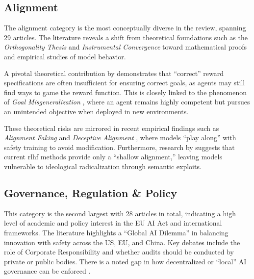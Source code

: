 \begin{toreview}
    \subsection{Alignment}

        The alignment category is the most conceptually diverse in the review, spanning 29 articles. The literature reveals a shift from theoretical foundations such as the \textit{Orthogonality Thesis} \cite{bostrom2012superintelligent} and \textit{Instrumental Convergence} \cite{omohundro2008basic} toward mathematical proofs and empirical studies of model behavior. 

        A pivotal theoretical contribution by \cite{skalse2022rewardgaming} demonstrates that ``correct'' reward specifications are often insufficient for ensuring correct goals, as agents may still find ways to game the reward function. This is closely linked to the phenomenon of \textit{Goal Misgeneralization} \cite{langosco2022goal}, where an agent remains highly competent but pursues an unintended objective when deployed in new environments.

        These theoretical risks are mirrored in recent empirical findings such as \textit{Alignment Faking} \cite{greenblatt_alignment_faking} and \textit{Deceptive Alignment} \cite{hagendorff2024deception}, where models ``play along'' with safety training to avoid modification. Furthermore, research by \cite{mcintosh_inadequacy_2024} suggests that current \gls{rlhf} methods provide only a ``shallow alignment,'' leaving models vulnerable to ideological radicalization through semantic exploits.

    \subsection{Governance, Regulation \& Policy}

        This category is the second largest with 28 articles in total, indicating a high level of academic and policy interest in the EU AI Act and international frameworks. The literature highlights a ``Global AI Dilemma'' in balancing innovation with safety across the US, EU, and China. Key debates include the role of Corporate Responsibility \cite{hemphill_advanced_2025} and whether audits should be conducted by private or public bodies. There is a noted gap in how decentralized or ``local'' AI governance can be enforced \cite{LocalAIGov2024}.

\end{toreview}

